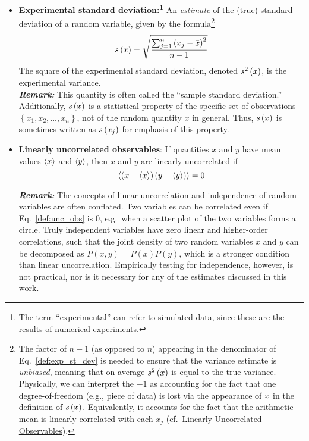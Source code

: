 \begin{itemize}
\item {\bf Experimental standard deviation:\footnote{
      The term ``experimental'' can refer to simulated data, since these are the results of numerical experiments.
}
} An \emph{estimate} of the (true) standard deviation of a random variable, given by the formula\footnote{The factor of $n-1$ (as opposed to $n$) appearing in the denominator of Eq.~\ref{def:exp_st_dev} is needed to ensure that the variance estimate is {\it unbiased}, meaning that on average $s^2\left( x \right)$ is equal to the true variance. Physically, we can interpret the $-1$ as accounting for the fact that one degree-of-freedom (e.g., piece of data) is lost via the appearance of $\bar{x}$ in the definition of $s\left( x \right)$.  Equivalently, it accounts for the fact that the arithmetic mean is linearly correlated with each $x_j$ (cf.\ \hyperref[def:unc_obs]{Linearly Uncorrelated Observables}).}
  \begin{equation}
    s\left( x \right) = \sqrt{\dfrac{\sum_{j=1}^n\left(x_j - \bar{x}\right)^2}{n-1}} \label{def:exp_st_dev}
  \end{equation}
  \smallskip
  The square of the experimental standard deviation, denoted $s^2\left( x \right)$, is the experimental variance.\\
  \textbf{\textit{Remark:}} This quantity is often called the ``sample standard deviation.''
  Additionally, $s\left( x \right)$ is a statistical property of the specific set of observations $\left\{x_1,x_2,...,x_n\right\}$, not of the random quantity $x$ in general.
  Thus, $s\left( x \right)$ is sometimes written as $s\left( x_j \right)$ for emphasis of this property.

  \item {\bf Linearly uncorrelated observables}:  If quantities $x$ and $y$ have mean values $\langle x \rangle$ and $\langle y \rangle$, then $x$ and $y$ are linearly uncorrelated if
\begin{equation}
  \langle  \left(x - \langle x \rangle \right) \left(y - \langle y \rangle \right)  \rangle = 0 \label{def:unc_obs}
\end{equation}

\textbf{\textit{Remark:}} The concepts of linear uncorrelation and independence of random variables are often conflated. Two variables can be correlated even if Eq.~\ref{def:unc_obs} is 0, e.g.~when a scatter plot of the two variables forms a circle. Truly independent variables have zero linear and higher-order correlations, such that the joint density of two random variables $x$ and $y$ can be decomposed as $P(x,y)=P(x)P(y)$, which is a stronger condition than linear uncorrelation.  Empirically testing for independence, however, is not practical, nor is it necessary for any of the estimates discussed in this work.


\end{itemize}
